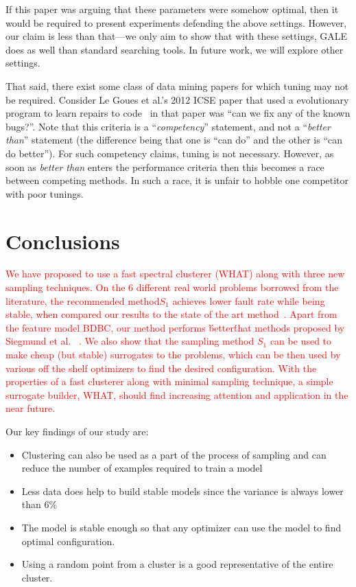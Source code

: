 \documentclass{sig-alternative}
\newcommand{\bi}{\begin{itemize}}%
\newcommand{\ei}{\end{itemize}}
\begin{document}
If this paper was arguing that these parameters were
somehow optimal, then it would be required to present
experiments defending the above settings. However, our
claim is less than that—we only aim to show that with
these settings, GALE does as well than standard searching
tools. In future work, we will explore other settings.




That said, there exist some class of data mining papers for which
tuning may not be required. Consider  Le Goues et al.'s 2012
ICSE paper that used a evolutionary program to learn
repairs to code~
in that paper was ``can we fix any of the known bugs?''. Note
that this criteria is a ``{\em competency}'' statement, and
not a ``{\em better than}'' statement (the difference being that
one is 
``can do'' and the other is ``can do better''). For such
competency claims, tuning is not necessary. However, as soon
as {\em better than} enters the performance criteria then this
becomes a race between competing methods. In such a race,
it is unfair to hobble one competitor with poor tunings.



\section{Conclusions}

\textcolor{red}{We have proposed to use a fast spectral clusterer (WHAT) along with three new sampling techniques. On the 6 different real world problems borrowed from the literature, the recommended method\textit{$S_1$} achieves lower fault rate while being stable, when compared our results to the state of the art method~\cite{siegmund2012predicting}. 
Apart from the feature model BDBC, our method performs \'better\' that methods proposed by Siegmund et al.  ~\cite{siegmund2012predicting}. We also show that the sampling method \textit{$S_1$} can be used to make cheap (but stable) surrogates to the problems, which can be then used by various off the shelf optimizers to find the desired configuration. 
With the properties of  a fast clusterer along with minimal sampling technique, a simple surrogate builder, WHAT, should find increasing attention and application in the near future.}

Our key findings of our study are:
\bi
    \item{Clustering can also be used as a part of the process of sampling and can reduce the number of examples required to train a model}
    \item{Less data does help to build stable models since the variance is always lower than 6\%}
    \item{The model is stable enough so that any optimizer can use the model to find optimal configuration.}
    \item{Using a random point from a cluster is a good representative of the entire cluster.}
\ei
\end{document}
